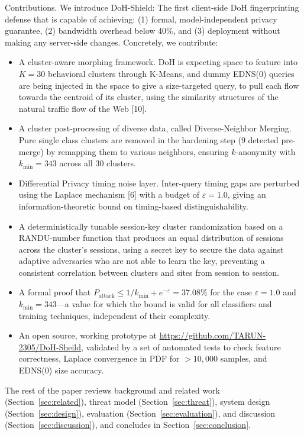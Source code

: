 \documentclass[conference]{IEEEtran}
\begin{document}
Contributions. We introduce DoH-Shield: The first client-side DoH fingerprinting defense that is capable of achieving: (1) formal, model-independent privacy guarantee, (2) bandwidth overhead below 40\%, and (3) deployment without making any server-side changes. Concretely, we contribute:
\begin{itemize}
    \item A cluster-aware morphing framework. DoH is expecting space to feature into $K=30$ behavioral clusters through K-Means, and dummy EDNS(0) queries are being injected in the space to give a size-targeted query, to pull each flow towards the centroid of its cluster, using the similarity structures of the natural traffic flow of the Web [10].
    \item A cluster post-processing of diverse data, called Diverse-Neighbor Merging. Pure single class clusters are removed in the hardening step (9 detected pre-merge) by remapping them to various neighbors, ensuring $k$-anonymity with $k_{\min} = 343$ across all 30 clusters.
    \item Differential Privacy timing noise layer. Inter-query timing gaps are perturbed using the Laplace mechanism [6] with a budget of $\varepsilon = 1.0$, giving an information-theoretic bound on timing-based distinguishability.
    \item A deterministically tunable session-key cluster randomization based on a RANDU-number function that produces an equal distribution of sessions across the cluster's sessions, using a secret key to secure the data against adaptive adversaries who are not able to learn the key, preventing a consistent correlation between clusters and sites from session to session.
    \item A formal proof that $P_{\text{attack}} \le 1/k_{\min} + e^{-\varepsilon} = 37.08\%$ for the case $\varepsilon=1.0$ and $k_{\min}=343$---a value for which the bound is valid for all classifiers and training techniques, independent of their complexity.
    \item An open source, working prototype at \url{https://github.com/TARUN-2305/DoH-Sheild}, validated by a set of automated tests to check feature correctness, Laplace convergence in PDF for $>10,000$ samples, and EDNS(0) size accuracy.
\end{itemize}

The rest of the paper reviews background and related work (Section~\ref{sec:related}), threat model (Section~\ref{sec:threat}), system design (Section~\ref{sec:design}), evaluation (Section~\ref{sec:evaluation}), and discussion (Section~\ref{sec:discussion}), and concludes in Section~\ref{sec:conclusion}.
\end{document}
